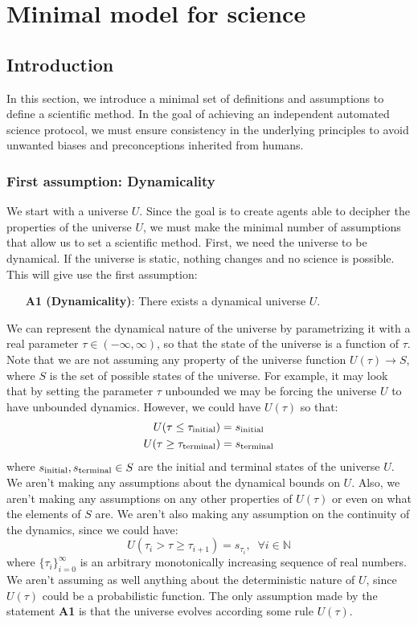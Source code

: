\documentclass[11pt,a4paper,twoside]{report}
\newcommand{\+}{\textnormal{+} }
\theoremstyle{definition}
\numberwithin{equation}{chapter}
\begin{document}
\vspace{12mm}


\chapter{Minimal model for science} \label{science}

\section{Introduction} \label{sec:intro_science}
In this section, we introduce a minimal set of definitions and assumptions to
define a scientific method. In the goal of achieving an independent automated
science protocol, we must ensure consistency in the underlying principles to
avoid unwanted biases and preconceptions inherited from humans.
\subsection{First assumption: Dynamicality}
We start with a universe $U$. Since the goal is to create agents able to
decipher the properties of the universe $U$, we must make the minimal number of
assumptions that allow us to set a scientific method. First, we need the
universe to be dynamical. If the universe is static, nothing changes and no
science is possible. This will give use the first assumption:

\begin{itemize}
  \item[\textbf{A1 (Dynamicality)}:] There exists a dynamical universe $U$.
\end{itemize}

We can represent the dynamical nature of the universe by parametrizing it with a
real parameter $\tau \in (-\infty,\infty)$, so that the state of the universe is
a function of $\tau$. Note that we are not assuming any property of the universe
function $U(\tau)\rightarrow S$, where $S$ is the set of possible states of the
universe. For example, it may look that by setting the parameter $\tau$
unbounded we may be forcing the universe $U$ to have unbounded dynamics.
However, we could have $U(\tau)$ so that:
\begin{align*}
  U(\tau \leq \tau_{\textnormal{initial}})&=s_\text{initial} \\
  U(\tau \geq \tau_{\textnormal{terminal}})&=s_\text{terminal}
\end{align*}
where $s_\textnormal{initial}, s_\textnormal{terminal} \in S $ are the initial
and terminal states of the universe $U$. We aren't making any assumptions about
the dynamical bounds on $U$. Also, we aren't making any assumptions on any other
properties of $U(\tau)$ or even on what the elements of $S$ are. We aren't also
making any assumption on the continuity of the dynamics, since we could have:
$$U(\tau_{i} >\tau \geq \tau_{i+1})=s_{\tau_i},\;\;\forall i \in \mathbb{N}$$
where $\{\tau_i\}_{i=0}^\infty$ is an arbitrary monotonically increasing
sequence of real numbers. We aren't assuming as well anything about the
deterministic nature of $U$, since $U(\tau)$ could be a probabilistic function.
The only assumption made by the statement \textbf{A1} is that the universe
evolves according some rule $U(\tau)$.
\end{document}
